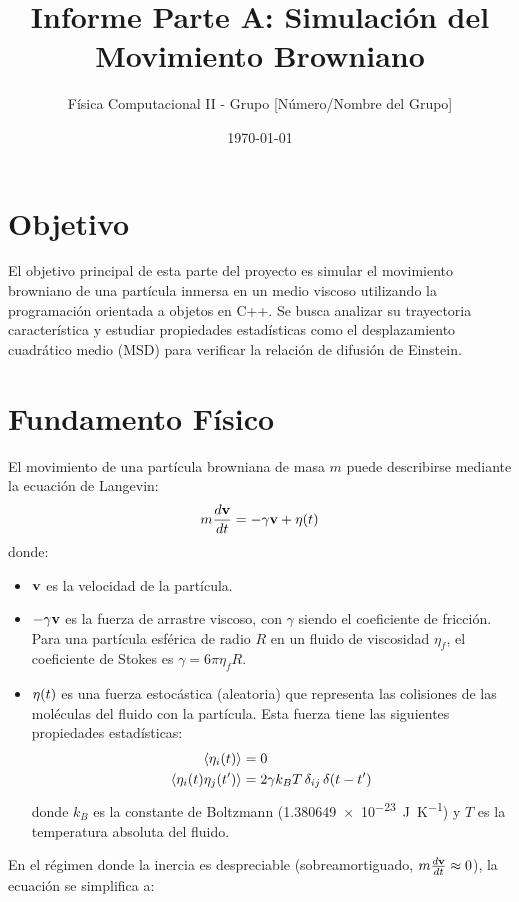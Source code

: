 \documentclass[11pt,a4paper]{article}
\title{Informe Parte A: Simulación del Movimiento Browniano}
\author{Física Computacional II - Grupo [Número/Nombre del Grupo]}
\date{\today}
\begin{document}
\maketitle
\tableofcontents
\newpage

\section{Objetivo}
El objetivo principal de esta parte del proyecto es simular el movimiento browniano de una partícula inmersa en un medio viscoso utilizando la programación orientada a objetos en C++. Se busca analizar su trayectoria característica y estudiar propiedades estadísticas como el desplazamiento cuadrático medio (MSD) para verificar la relación de difusión de Einstein.

\section{Fundamento Físico}
El movimiento de una partícula browniana de masa $m$ puede describirse mediante la ecuación de Langevin:
\begin{equation}
    m\frac{d\vb{v}}{dt} = -\gamma\vb{v} + \vb{\eta}(t)
    \label{eq:langevin_informe}
\end{equation}
donde:
\begin{itemize}
    \item $\vb{v}$ es la velocidad de la partícula.
    \item $-\gamma\vb{v}$ es la fuerza de arrastre viscoso, con $\gamma$ siendo el coeficiente de fricción. Para una partícula esférica de radio $R$ en un fluido de viscosidad $\eta_f$, el coeficiente de Stokes es $\gamma = 6\pi\eta_f R$.
    \item $\vb{\eta}(t)$ es una fuerza estocástica (aleatoria) que representa las colisiones de las moléculas del fluido con la partícula. Esta fuerza tiene las siguientes propiedades estadísticas:
    \begin{align}
        \expval{\eta_i(t)} &= 0 \\
        \expval{\eta_i(t)\eta_j(t')} &= 2\gamma k_B T\,\delta_{ij}\,\delta(t-t')
        \label{eq:fuerza_estocastica_informe}
    \end{align}
    donde $k_B$ es la constante de Boltzmann (\SI{1.380649e-23}{\joule\per\kelvin}) y $T$ es la temperatura absoluta del fluido.
\end{itemize}
En el régimen donde la inercia es despreciable (sobreamortiguado, $m \frac{d\vb{v}}{dt} \approx 0$), la ecuación se simplifica a:
\end{document}
